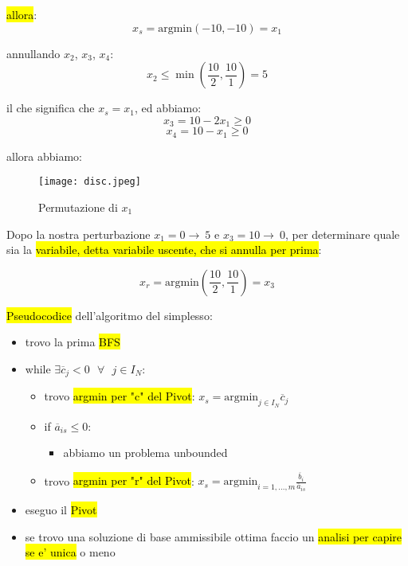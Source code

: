\begin{enumerate}
		\hl{allora}:
		$$x_s = \text{argmin} (-10, -10) = x_1$$

		annullando $x_2$, $x_3$, $x_4$:
		$$x_2 \leq \min (\frac{10}{2}, \frac{10}{1}) = 5$$

		il che significa che $x_s = x_1$, ed abbiamo:
		$$x_3 = 10 - 2x_1 \geq 0$$
		$$x_4 = 10 - x_1 \geq 0$$

		allora abbiamo:


		\begin{figure}[H]
		\centering
		\texttt{[image: disc.jpeg]}
		\caption{Permutazione di $x_1$} 
		\label{disc}
		\end{figure}


		Dopo la nostra perturbazione $x_1 = 0 \to\ 5$ e $x_3 = 10 \to\ 0$, per determinare quale sia la \hl{variabile, detta variabile uscente, che si annulla per prima}:

		$$x_r = \text{argmin} (\frac{10}{2}, \frac{10}{1}) = x_3$$

\end{enumerate}

\hl{Pseudocodice} dell'algoritmo del simplesso:

\begin{itemize}
	\item[] trovo la prima \hl{BFS}
	\item[] while $\exists \overline{c}_j<0\ \ \ \forall\ \ \ j \in I_N$:
	
	\begin{itemize}
		\item[] trovo \hl{argmin per "c" del Pivot}: $x_s = \text{argmin}_{j \in I_N} \overline{c}_j$
		\item[] if $\overline{a}_{is} \leq 0$:
		
		\begin{itemize}
			\item[] abbiamo un problema unbounded
		\end{itemize}
		
		\item[] trovo \hl{argmin per "r" del Pivot}: $x_s = \text{argmin}_{i = 1,...,m} \frac{\overline{b}_i}{\overline{a}_{is}}$
	\end{itemize}
	
	\item[] eseguo il \hl{Pivot}
	\item[] se trovo una soluzione di base ammissibile ottima faccio un \hl{analisi per capire se e' unica} o meno
\end{itemize}


